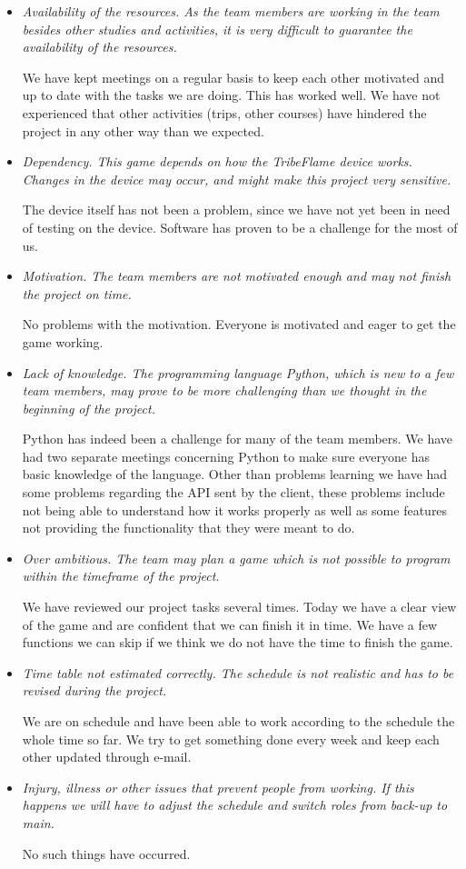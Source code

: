 \documentclass[12pt,a4paper]{article}
\begin{document}
\begin{itemize}
\item \textit{Availability of the resources. As the team members are working in the team besides other studies and activities, it is very difficult to guarantee the availability of the resources.}

We have kept meetings on a regular basis to keep each other motivated and up to date with the tasks we are doing. This has worked well. We have not experienced that other activities (trips, other courses) have hindered the project in any other way than we expected.
\item \textit{Dependency. This game depends on how the TribeFlame device works. Changes in the device may occur, and might make this project very sensitive.}

The device itself has not been a problem, since we have not yet been in need of testing on the device. Software has proven to be a challenge for the most of us.

\item \textit{Motivation. The team members are not motivated enough and may not finish the project on time.}

No problems with the motivation. Everyone is motivated and eager to get the game working.

\item \textit{Lack of knowledge. The programming language Python, which is new to a few team members, may prove to be more challenging than we thought in the beginning of the project.}

Python has indeed been a challenge for many of the team members. We have had two separate meetings concerning Python to make sure everyone has basic knowledge of the language. Other than problems learning we have had some problems regarding the API sent by the client, these problems include not being able to understand how it works properly as well as some features not providing the functionality that they were meant to do.

\item \textit{Over ambitious. The team may plan a game which is not possible to program within the timeframe of the project.}

We have reviewed our project tasks several times. Today we have a clear view of the game and are confident that we can finish it in time. We have a few functions we can skip if we think we do not have the time to finish the game.

\item \textit{Time table not estimated correctly. The schedule is not realistic and has to be revised during the project.}

We are on schedule and have been able to work according to the schedule the whole time so far. We try to get something done every week and keep each other updated through e-mail.

\item \textit{Injury, illness or other issues that prevent people from working. If this happens we will have to adjust the schedule and switch roles from back-up to main.}

No such things have occurred.
\end{itemize}
\end{document}
